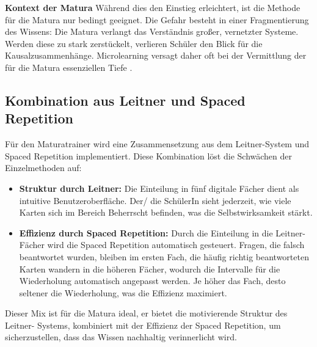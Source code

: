 \textbf{Kontext der Matura}
Während dies den Einstieg erleichtert, ist die Methode für die Matura nur bedingt
geeignet. Die Gefahr besteht in einer Fragmentierung des Wissens: Die Matura verlangt
das Verständnis großer, vernetzter Systeme. Werden diese zu stark zerstückelt, verlieren
Schüler den Blick für die Kausalzusammenhänge. Microlearning versagt daher oft bei
der Vermittlung der für die Matura essenziellen Tiefe \cite{FeedbackTimeMultimediaLearning}.

\subsection{Kombination aus Leitner und Spaced Repetition}

Für den Maturatrainer wird eine Zusammensetzung aus dem Leitner-System und Spaced
Repetition implementiert. Diese Kombination löst die Schwächen der Einzelmethoden
auf:

\begin{itemize}
    \item \textbf{Struktur durch Leitner:} Die Einteilung in fünf digitale Fächer dient als intuitive
Benutzeroberfläche. Der/ die SchülerIn sieht jederzeit, wie viele Karten sich im Bereich
Beherrscht befinden, was die Selbstwirksamkeit stärkt\cite{LeitnerWikipedia}.
    \item \textbf{Effizienz durch Spaced Repetition:} Durch die Einteilung in die Leitner-
Fächer wird die Spaced Repetition automatisch gesteuert. Fragen, die falsch
beantwortet wurden, bleiben im ersten Fach, die häufig richtig beantworteten
Karten wandern in die höheren Fächer, wodurch die Intervalle für die Wiederholung
automatisch angepasst werden. Je höher das Fach, desto seltener die Wiederholung,
was die Effizienz maximiert\cite{hymerLeitner}.
\end{itemize}

Dieser Mix ist für die Matura ideal, er bietet die motivierende Struktur des Leitner-
Systems, kombiniert mit der Effizienz der Spaced Repetition, um sicherzustellen, dass
das Wissen nachhaltig verinnerlicht wird.
